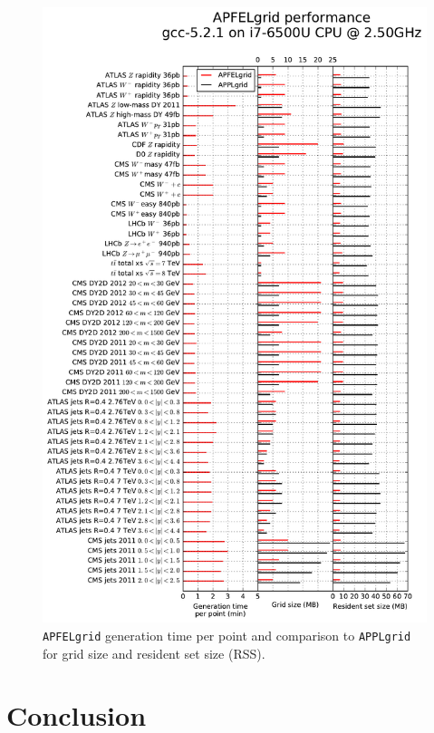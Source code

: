 \documentclass[preprint,12pt]{elsarticle}
\begin{document}
\begin{figure}
  \centering                                      
  \includegraphics[scale=0.6]{plots/t0b}
\caption{\small {\tt APFELgrid} generation time per point and
  comparison to {\tt APPLgrid} for grid size and resident set size
  (RSS).}
\label{fig:performance}
\end{figure}

\section{Conclusion}\label{sec:conclusion}
\end{document}
